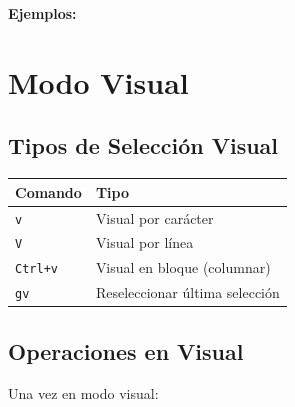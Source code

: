 \documentclass[
  doc,
  floatsintext,
  longtable,
  a4paper,
  nolmodern,
  notxfonts,
  notimes,
  12pt,
  colorlinks=true,linkcolor=blue,citecolor=blue,urlcolor=blue]{apa7}
\newenvironment{Shaded}{\begin{snugshade}}{\end{snugshade}}
\newcommand{\NormalTok}[1]{\textcolor[rgb]{0.00,0.23,0.31}{#1}}
\newcounter{none} %
\begin{document}
\textbf{Ejemplos:}

\begin{Shaded}
\end{Shaded}

\section{Modo Visual}\label{modo-visual-1}

\subsection{Tipos de Selección
Visual}\label{tipos-de-selecciuxf3n-visual}

{\def\LTcaptype{none} %
\begin{longtable}[]{@{}ll@{}}
\toprule\noalign{}
Comando & Tipo \\
\midrule\noalign{}
\endhead
\bottomrule\noalign{}
\endlastfoot
\texttt{v} & Visual por carácter \\
\texttt{V} & Visual por línea \\
\texttt{Ctrl+v} & Visual en bloque (columnar) \\
\texttt{gv} & Reseleccionar última selección \\
\end{longtable}
}

\subsection{Operaciones en Visual}\label{operaciones-en-visual}

Una vez en modo visual:
\end{document}
